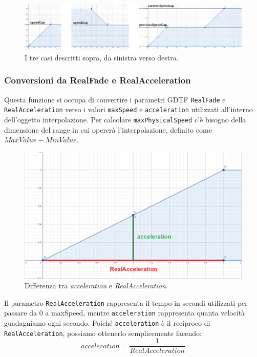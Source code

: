 \documentclass[main.tex]{subfiles}
\begin{document}
\begin{figure}[H]
    \centering
    \includegraphics[width=1\linewidth]{img/interpolazione/speedCapThreeCases-split.png}
    \caption{I tre casi descritti sopra, da sinistra verso destra.}
    \label{fig:4_speedCapThreeCases}
\end{figure}

\subsubsection{Conversioni da RealFade e RealAcceleration}\label{subsubsec:4_2_Conversions}
Questa funzione si occupa di convertire i parametri GDTF \lstinline{RealFade} e \lstinline{RealAcceleration} verso i valori \lstinline{maxSpeed} e \lstinline{acceleration} utilizzati all'interno dell'oggetto interpolazione. Per calcolare \lstinline{maxPhysicalSpeed} c'è bisogno della dimensione del range in cui opererà l'interpolazione, definito come $MaxValue - MinValue$.\newline

\begin{figure}
    \centering
    \captionsetup{justification=centering}
    \includegraphics[scale=0.3]{img/interpolazione/RealAccelerationVSacceleration.png}
    \caption{Differenza tra \textit{acceleration} e \textit{RealAcceleration}.}
    \label{fig:4_RealAccelerationVSacceleration}
\end{figure}
Il parametro \lstinline{RealAcceleration} rappresenta il tempo in secondi utilizzati per passare da 0 a maxSpeed, mentre \lstinline{acceleration} rappresenta quanta velocità guadagniamo ogni secondo. Poiché \lstinline{acceleration} è il reciproco di \lstinline{RealAcceleration}, possiamo ottenerlo semplicemente facendo:
\[acceleration = \frac{1}{RealAcceleration}\] \newline
\end{document}
